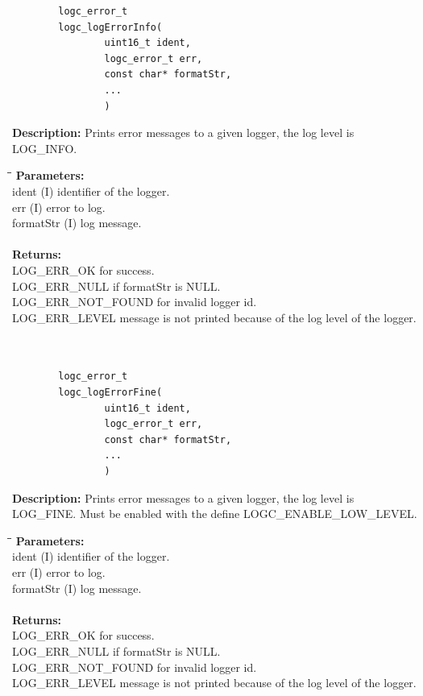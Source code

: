 \documentclass[a4paper, titlepage, 11pt]{article}
\begin{document}
\newpage

\small
\begin{verbatim}
        logc_error_t
        logc_logErrorInfo(
                uint16_t ident,
                logc_error_t err,
                const char* formatStr,
                ...
                )
\end{verbatim}
\normalsize
\textbf{Description:} Prints error messages to a given logger, the log level is LOG\_INFO.
\begin{tabbing}
\hspace*{1cm}\=\hspace*{2cm}\=\hspace*{0,6cm}\= \kill
\textbf{Parameters:} \\
\> ident \> (I) identifier of the logger. \\
\> err \> (I) error to log. \\
\> formatStr \> (I) log message. \\ \\
\textbf{Returns:} \\
\> LOG\_ERR\_OK for success. \\
\> LOG\_ERR\_NULL if formatStr is NULL. \\
\> LOG\_ERR\_NOT\_FOUND for invalid logger id. \\
\> LOG\_ERR\_LEVEL message is not printed because of the log level of the logger. \\ \\ \\
\end{tabbing}

\small
\begin{verbatim}
        logc_error_t
        logc_logErrorFine(
                uint16_t ident,
                logc_error_t err,
                const char* formatStr,
                ...
                )
\end{verbatim}
\normalsize
\textbf{Description:} Prints error messages to a given logger, the log level is LOG\_FINE. Must be enabled with the define LOGC\_ENABLE\_LOW\_LEVEL.
\begin{tabbing}
\hspace*{1cm}\=\hspace*{2cm}\=\hspace*{0,6cm}\= \kill
\textbf{Parameters:} \\
\> ident \> (I) identifier of the logger. \\
\> err \> (I) error to log. \\
\> formatStr \> (I) log message. \\ \\
\textbf{Returns:} \\
\> LOG\_ERR\_OK for success. \\
\> LOG\_ERR\_NULL if formatStr is NULL. \\
\> LOG\_ERR\_NOT\_FOUND for invalid logger id. \\
\> LOG\_ERR\_LEVEL message is not printed because of the log level of the logger. \\
\end{tabbing}
\end{document}
